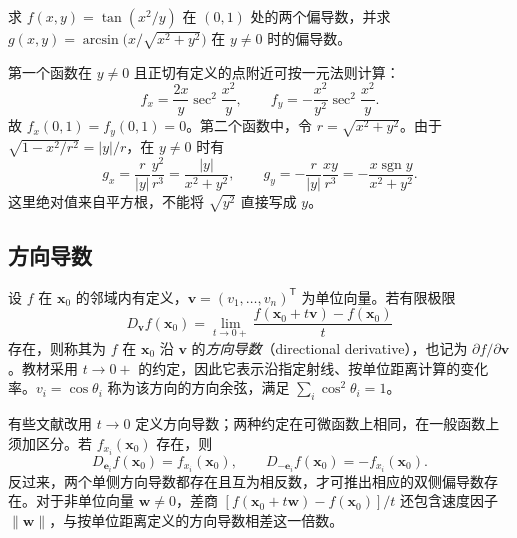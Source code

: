 \documentclass[UTF8,12pt,a4paper,fontset=fandol]{ctexbook}
\begin{document}
\begin{example}
\label{ex:partial-derivative-computation-ch14}
求 $f(x,y)=\tan(x^2/y)$ 在 $(0,1)$ 处的两个偏导数，并求 $g(x,y)=\arcsin\bigl(x/\sqrt{x^2+y^2}\bigr)$ 在 $y\ne0$ 时的偏导数。
\end{example}
\begin{solve}
第一个函数在 $y\ne0$ 且正切有定义的点附近可按一元法则计算：
\[
    f_x=\frac{2x}{y}\sec^2\frac{x^2}{y},
    \qquad f_y=-\frac{x^2}{y^2}\sec^2\frac{x^2}{y}.
\]
故 $f_x(0,1)=f_y(0,1)=0$。第二个函数中，令 $r=\sqrt{x^2+y^2}$。由于 $\sqrt{1-x^2/r^2}=|y|/r$，在 $y\ne0$ 时有
\[
    g_x=\frac{r}{|y|}\frac{y^2}{r^3}
        =\frac{|y|}{x^2+y^2},
    \qquad
    g_y=-\frac{r}{|y|}\frac{xy}{r^3}
        =-\frac{x\operatorname{sgn}y}{x^2+y^2}.
\]
这里绝对值来自平方根，不能将 $\sqrt{y^2}$ 直接写成 $y$。
\end{solve}

\subsection{方向导数}
\label{subsec:directional-derivatives}

\begin{definition}
\label{def:one-sided-directional-derivative-ch14}
设 $f$ 在 $\boldsymbol x_0$ 的邻域内有定义，$\boldsymbol v=(v_1,\ldots,v_n)^{\mathsf T}$ 为单位向量。若有限极限
\begin{equation}
\label{eq:one-sided-directional-derivative-ch14}
    D_{\boldsymbol v}f(\boldsymbol x_0)
    =\lim_{t\to0+}\frac{f(\boldsymbol x_0+t\boldsymbol v)-f(\boldsymbol x_0)}{t}
\end{equation}
存在，则称其为 $f$ 在 $\boldsymbol x_0$ 沿 $\boldsymbol v$ 的\emph{方向导数}（directional derivative），也记为 $\partial f/\partial\boldsymbol v$。教材采用 $t\to0+$ 的约定，因此它表示沿指定射线、按单位距离计算的变化率。$v_i=\cos\theta_i$ 称为该方向的方向余弦，满足 $\sum_i\cos^2\theta_i=1$。
\end{definition}

有些文献改用 $t\to0$ 定义方向导数；两种约定在可微函数上相同，在一般函数上须加区分。若 $f_{x_i}(\boldsymbol x_0)$ 存在，则
\[
    D_{\boldsymbol e_i}f(\boldsymbol x_0)=f_{x_i}(\boldsymbol x_0),
    \qquad D_{-\boldsymbol e_i}f(\boldsymbol x_0)=-f_{x_i}(\boldsymbol x_0).
\]
反过来，两个单侧方向导数都存在且互为相反数，才可推出相应的双侧偏导数存在。对于非单位向量 $\boldsymbol w\ne0$，差商 $[f(\boldsymbol x_0+t\boldsymbol w)-f(\boldsymbol x_0)]/t$ 还包含速度因子 $\|\boldsymbol w\|$，与按单位距离定义的方向导数相差这一倍数。
\end{document}
